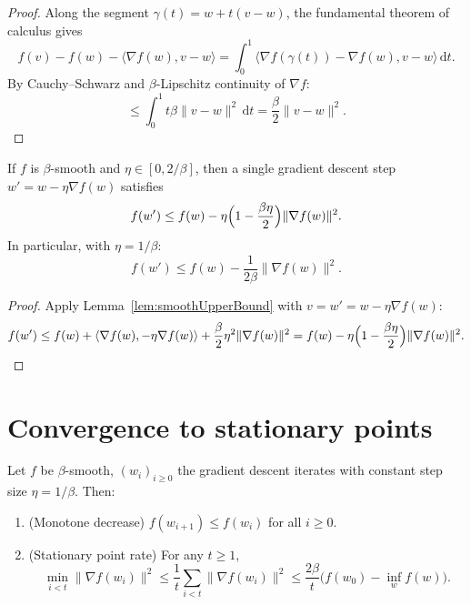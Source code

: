 \begin{proof}
  \leanok
Along the segment $\gamma(t) = w + t(v - w)$, the fundamental theorem of calculus gives
\[
  f(v) - f(w) - \langle \nabla f(w), v - w \rangle
  = \int_0^1 \langle \nabla f(\gamma(t)) - \nabla f(w), v - w \rangle \, \mathrm{d}t.
\]
By Cauchy--Schwarz and $\beta$-Lipschitz continuity of $\nabla f$:
\[
  \le \int_0^1 t \beta \|v - w\|^2 \, \mathrm{d}t = \frac{\beta}{2} \|v - w\|^2.
\]
\end{proof}

\begin{lemma}\label{lem:gdDescentStep}
  \leanok
If $f$ is $\beta$-smooth and $\eta \in [0, 2/\beta]$, then a single gradient descent step $w' = w - \eta \nabla f(w)$ satisfies
\[
  f(w') \le f(w) - \eta \Bigl(1 - \frac{\beta \eta}{2}\Bigr) \|\nabla f(w)\|^2.
\]
In particular, with $\eta = 1/\beta$:
\[
  f(w') \le f(w) - \frac{1}{2\beta} \|\nabla f(w)\|^2.
\]
\end{lemma}

\begin{proof}
  \leanok
Apply Lemma~\ref{lem:smoothUpperBound} with $v = w' = w - \eta \nabla f(w)$:
\[
  f(w') \le f(w) + \langle \nabla f(w), -\eta \nabla f(w) \rangle + \frac{\beta}{2}\eta^2 \|\nabla f(w)\|^2
         = f(w) - \eta\Bigl(1 - \frac{\beta\eta}{2}\Bigr)\|\nabla f(w)\|^2.
\]
\end{proof}


\section{Convergence to stationary points}
\label{sec:stationary}

\begin{theorem}\label{thm:gdStationary}
Let $f$ be $\beta$-smooth, $(w_i)_{i \ge 0}$ the gradient descent iterates with constant step size $\eta = 1/\beta$.
Then:
\begin{enumerate}
  \item (Monotone decrease) $f(w_{i+1}) \le f(w_i)$ for all $i \ge 0$.
  \item (Stationary point rate) For any $t \ge 1$,
    \[
      \min_{i < t} \|\nabla f(w_i)\|^2
      \le \frac{1}{t} \sum_{i < t} \|\nabla f(w_i)\|^2
      \le \frac{2\beta}{t} \bigl(f(w_0) - \inf_w f(w)\bigr).
    \]
\end{enumerate}
\end{theorem}

